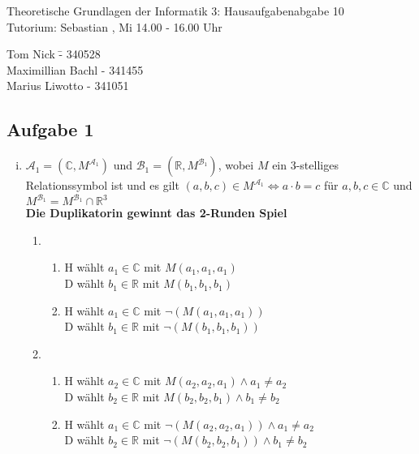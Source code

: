 \documentclass[a4paper,10pt]{article}
\begin{document}
\begin{center}
\Large{Theoretische Grundlagen der Informatik 3: Hausaufgabenabgabe 10} \\
\large{Tutorium: Sebastian , Mi 14.00 - 16.00 Uhr}
\end{center}
\begin{tabbing}
Tom Nick \hspace{2cm}\= - 340528\\
Maximillian Bachl \> - 341455 \\
Marius Liwotto\> -  341051
\end{tabbing}
\subsection*{Aufgabe 1}
\begin{enumerate}[(i)]
	\item $\mathcal{A}_1 = (\mathbb{C},M^{\mathcal{A}_1})$ und $\mathcal{B}_1 = (\mathbb{R}, M^{\mathcal{B}_1})$, wobei $M$ ein 3-stelliges Relationssymbol ist und es gilt $(a,b,c) \in M^{\mathcal{A}_1} \Leftrightarrow a \cdot b = c$ für $a,b,c \in \mathbb{C}$ und $M^{\mathcal{B}_1} = M^{\mathcal{B}_1} \cap \mathbb{R}^3$ \\
	\textbf{Die Duplikatorin gewinnt das 2-Runden Spiel}
		\begin{enumerate}[1. \text{Zug:}]
			\item  	
			\begin{enumerate}
				\item  	H wählt $a_1 \in \mathbb{C}$ mit $M(a_1,a_1,a_1)$ \\
					D wählt $b_1 \in \mathbb{R}$ mit $M(b_1,b_1,b_1)$
				\item  	H wählt $a_1 \in \mathbb{C}$ mit $\lnot(M(a_1,a_1,a_1))$ \\
					D wählt $b_1 \in \mathbb{R}$ mit $\lnot(M(b_1,b_1,b_1))$
			\end{enumerate}
			\item  	
			\begin{enumerate}
				\item  	H wählt $a_2 \in \mathbb{C}$ mit $M(a_2,a_2,a_1) \land a_1 \neq a_2$ \\
					D wählt $b_2 \in \mathbb{R}$ mit $M(b_2,b_2,b_1) \land b_1 \neq b_2$
				\item  	H wählt $a_1 \in \mathbb{C}$ mit $\lnot(M(a_2,a_2,a_1)) \land a_1 \neq a_2$ \\
					D wählt $b_2 \in \mathbb{R}$ mit $\lnot(M(b_2,b_2,b_1)) \land b_1 \neq b_2$

\end{enumerate}
\end{enumerate}
\end{enumerate}
\end{document}
